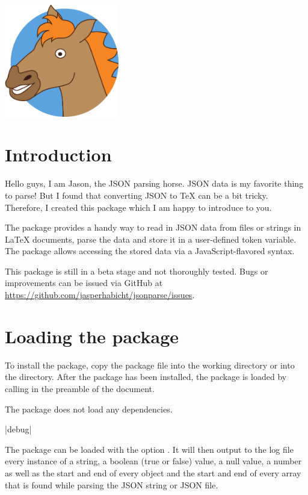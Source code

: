 \documentclass[a4paper]{article}
\begin{document}
\vspace*{-1cm}
\noindent\hspace*{-3.5mm}\includegraphics[width=5cm]{jason/jason.pdf}

\printdoctitle

\bigskip

\section{Introduction}

Hello guys, I am Jason, the JSON parsing horse. JSON data is my favorite thing to parse! But I found that converting JSON to TeX can be a bit tricky. Therefore, I created this package which I am happy to introduce to you.

The  package provides a handy way to read in JSON data from files or strings in LaTeX documents, parse the data and store it in a user-defined token variable. The package allows accessing the stored data via a JavaScript-flavored syntax.

This package is still in a beta stage and not thoroughly tested. Bugs or improvements can be issued via GitHub at \url{https://github.com/jasperhabicht/jsonparse/issues}.

\section{Loading the package}

To install the package, copy the package file  into the working directory or into the  directory. After the package has been installed, the  package is loaded by calling \macro{\usepackage{jsonparse}} in the preamble of the document. 

The package does not load any dependencies.

\begin{macrodef}
|debug|
\end{macrodef}
The package can be loaded with the option . It will then output to the log file every instance of a string, a boolean (true or false) value, a null value, a number as well as the start and end of every object and the start and end of every array that is found while parsing the JSON string or JSON file.
\end{document}
